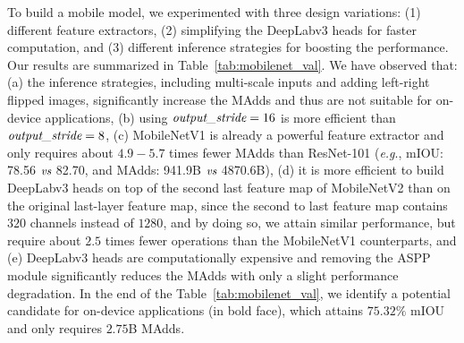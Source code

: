 \documentclass[10pt,twocolumn,letterpaper]{article}
\def\eg{\emph{e.g}.}
\begin{document}
To build a mobile model, we experimented with three design variations: (1) different feature extractors, (2) simplifying the \mbox{DeepLabv3} heads for faster computation, and (3) different inference strategies for boosting the performance.
Our results are summarized in Table~\ref{tab:mobilenet_val}.
We have observed that: (a) the inference strategies, including multi-scale inputs and adding left-right flipped images, significantly increase the MAdds and thus are not suitable for on-device applications, (b) using $\emph{output\_stride}=16$ is more efficient than $\emph{output\_stride}=8$, (c) \mbox{MobileNetV1} is already a powerful feature extractor and only requires about $4.9 - 5.7$ times fewer MAdds than ResNet-101 \cite{ResNet} (\eg, mIOU: 78.56 $\emph{vs}$ 82.70, and MAdds: 941.9B $\emph{vs}$ 4870.6B), (d) it is more efficient to build \mbox{DeepLabv3} heads on top of the second last feature map of \mbox{MobileNetV2} than on the original last-layer feature map, since the second to last feature map contains $320$ channels instead of $1280$, and by doing so, we attain similar performance, but require about $2.5$ times fewer operations than the \mbox{MobileNetV1} counterparts, and (e) \mbox{DeepLabv3} heads are computationally expensive and removing the ASPP module significantly reduces the MAdds with only a slight performance degradation.
In the end of the Table~\ref{tab:mobilenet_val}, we identify a potential candidate for on-device applications (in bold face), which attains $75.32\%$ mIOU and only requires $2.75$B MAdds.
\end{document}
